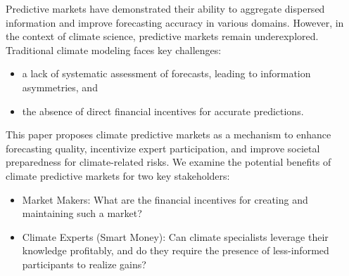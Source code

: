Predictive markets have demonstrated their 
ability to aggregate dispersed information and 
improve forecasting accuracy in various domains. 
However, in the context of climate science, 
predictive markets remain underexplored. 
Traditional climate modeling faces key challenges: 

\begin{itemize}
    \item a lack of systematic assessment of forecasts, leading to information asymmetries, and
    \item the absence of direct financial incentives for accurate predictions.
\end{itemize}
This paper proposes climate predictive markets as 
a mechanism to enhance forecasting quality, 
incentivize expert participation, and 
improve societal preparedness for climate-related risks.
We examine the potential benefits of 
climate predictive markets for two key stakeholders:
\begin{itemize}
    \item Market Makers: What are the financial incentives for creating and maintaining such a market?
    \item Climate Experts (Smart Money): Can climate specialists leverage their knowledge profitably, and do they require the presence of less-informed participants to realize gains?
\end{itemize}
